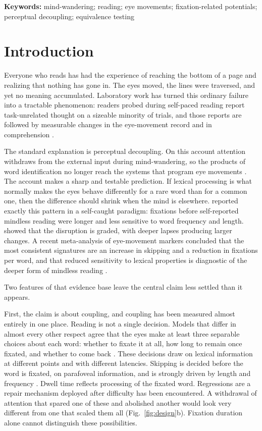 \documentclass[11pt]{article}
\begin{document}
\vspace{0.5em}
\noindent\textbf{Keywords:} mind-wandering; reading; eye movements; fixation-related potentials;
perceptual decoupling; equivalence testing

\newpage

\section{Introduction}

Everyone who reads has had the experience of reaching the bottom of a page and realizing that
nothing has gone in. The eyes moved, the lines were traversed, and yet no meaning accumulated.
Laboratory work has turned this ordinary failure into a tractable phenomenon: readers probed
during self-paced reading report task-unrelated thought on a sizeable minority of trials, and
those reports are followed by measurable changes in the eye-movement record and in
comprehension \citep{smallwood2006,schooler2011,smallwood2015}.

The standard explanation is perceptual decoupling. On this account attention withdraws from
the external input during mind-wandering, so the products of word identification no longer
reach the systems that program eye movements \citep{smallwood2011cascade,schooler2011}. The
account makes a sharp and testable prediction. If lexical processing is what normally makes
the eyes behave differently for a rare word than for a common one, then the difference should
shrink when the mind is elsewhere. \citet{reichle2010} reported exactly this pattern in a
self-caught paradigm: fixations before self-reported mindless reading were longer and less
sensitive to word frequency and length. \citet{schad2012} showed that the disruption is
graded, with deeper lapses producing larger changes. A recent meta-analysis of eye-movement
markers concluded that the most consistent signatures are an increase in skipping and a
reduction in fixations per word, and that reduced sensitivity to lexical properties is
diagnostic of the deeper form of mindless reading \citep{meziere2025}.

Two features of that evidence base leave the central claim less settled than it appears.

First, the claim is about coupling, and coupling has been measured almost entirely in one
place. Reading is not a single decision. Models that differ in almost every other respect
agree that the eyes make at least three separable choices about each word: whether to fixate
it at all, how long to remain once fixated, and whether to come back
\citep{reichle2003,engbert2005,rayner2009}. These decisions draw on lexical information at
different points and with different latencies. Skipping is decided before the word is
fixated, on parafoveal information, and is strongly driven by length and frequency
\citep{rayner1998,kliegl2004}. Dwell time reflects processing of the fixated word. Regressions
are a repair mechanism deployed after difficulty has been encountered. A withdrawal of
attention that spared one of these and abolished another would look very different from one
that scaled them all (Fig.~\ref{fig:design}b). Fixation duration alone cannot distinguish these
possibilities.
\end{document}
